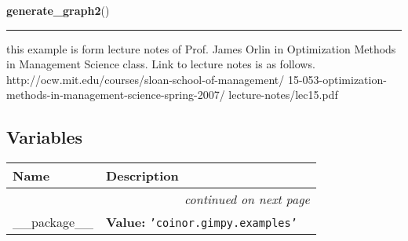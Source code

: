     \vspace{0.5ex}

\hspace{.8\funcindent}\begin{boxedminipage}{\funcwidth}

    \raggedright \textbf{generate\_graph2}()

    \vspace{-1.5ex}

    \rule{\textwidth}{0.5\fboxrule}
\setlength{\parskip}{2ex}
    this example is form lecture notes of Prof. James Orlin in Optimization
    Methods in Management Science class. Link to lecture notes is as 
    follows. http://ocw.mit.edu/courses/sloan-school-of-management/ 
    15-053-optimization-methods-in-management-science-spring-2007/ 
    lecture-notes/lec15.pdf

\setlength{\parskip}{1ex}
    \end{boxedminipage}



  \subsection{Variables}

    \vspace{-1cm}
\hspace{\varindent}\begin{longtable}{|p{\varnamewidth}|p{\vardescrwidth}|l}
\cline{1-2}
\cline{1-2} \centering \textbf{Name} & \centering \textbf{Description}& \\
\cline{1-2}
\endhead\cline{1-2}\multicolumn{3}{r}{\small\textit{continued on next page}}\\\endfoot\cline{1-2}
\endlastfoot\raggedright \_\-\_\-p\-a\-c\-k\-a\-g\-e\-\_\-\_\- & \raggedright \textbf{Value:} 
{\tt \texttt{'}\texttt{coinor.gimpy.examples}\texttt{'}}&\\
\cline{1-2}
\end{longtable}

